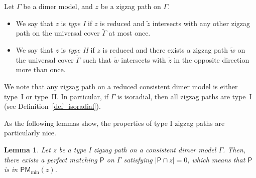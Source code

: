 \documentclass[pdftex]{sigma}%
\numberwithin{equation}{section}
\numberwithin{figure}{section}
\numberwithin{table}{section}
\newtheorem{Lemma}[Theorem]{Lemma}
\newcommand{\sfP}{\mathsf{P}}
\newcommand{\PM}{\mathsf{PM}}
\begin{document}
\begin{Definition}\label{def_zigzag_type}
Let $\Gamma$ be a dimer model, and $z$ be a zigzag path on $\Gamma$.
\begin{itemize}\itemsep=0pt
\item[(1)] We say that $z$ is \emph{type I} if $z$ is reduced and $\widetilde{z}$ intersects with any other zigzag path on the universal cover $\widetilde{\Gamma}$ at most once.
\item[(2)] We say that $z$ is \emph{type II} if $z$ is reduced and there exists a zigzag path $\widetilde{w}$ on the universal cover $\widetilde{\Gamma}$ such that $\widetilde{w}$ intersects with $\widetilde{z}$ in the opposite direction more than once.
\end{itemize}
We note that any zigzag path on a reduced consistent dimer model is either type~I or type~II.
In particular, if $\Gamma$ is isoradial, then all zigzag paths are type~I (see Definition~\ref{def_isoradial}).
\end{Definition}

As the following lemmas show, the properties of type I zigzag paths are particularly nice.

\begin{Lemma}\label{lem_existence_pm}
Let $z$ be a type I zigzag path on a consistent dimer model $\Gamma$.
Then, there exists a perfect matching $\sfP$ on $\Gamma$ satisfying $|\sfP\cap z|=0$, which means that $\sfP$ is in $\PM_{\min}(z)$.
\end{Lemma}
\end{document}
